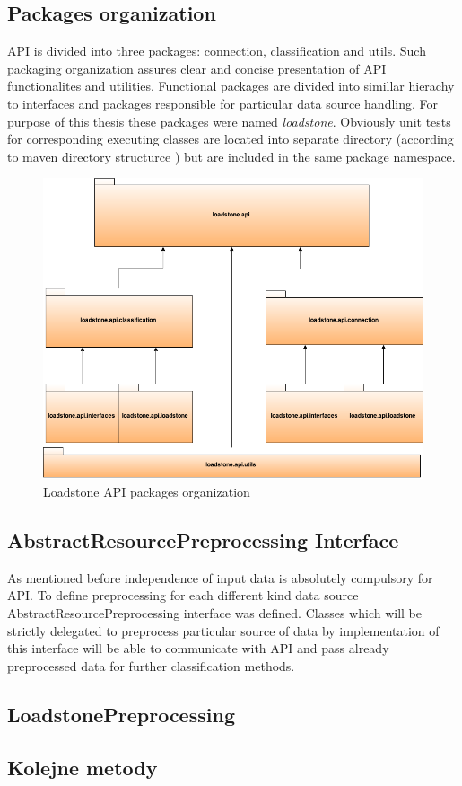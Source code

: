 \subsection{Packages organization}
API is divided into three packages: connection, classification and utils. Such packaging organization assures clear and concise presentation of API functionalites and utilities. Functional packages are divided into simillar hierachy to interfaces and packages responsible for particular data source handling. For purpose of this thesis these packages were named \textit{loadstone}. Obviously unit tests for corresponding executing classes are located into separate directory (according to maven directory structurce \cite{20}) but are included in the same package namespace.
\begin{figure}
 	\centering
 	\includegraphics[scale=0.5]{packages_orgazniation.png}
 	\caption{Loadstone API packages organization}
 	\label{fig:@=packages_oragnization}
\end{figure}
\subsection{AbstractResourcePreprocessing Interface}
As mentioned before independence of input data is absolutely compulsory for API. To define preprocessing for each different kind data source  AbstractResourcePreprocessing interface was defined. Classes which will be strictly delegated to preprocess particular source of data by implementation of this interface will be able to communicate with API and pass already preprocessed data for further classification methods. 
\subsection{LoadstonePreprocessing}

\subsection{Kolejne metody}
